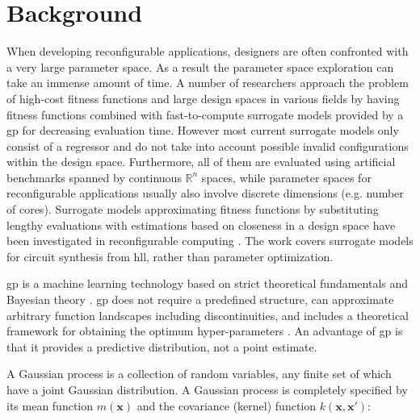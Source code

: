 \documentclass[runningheads,a4paper]{llncs}
\begin{document}
\section{Background}


When developing reconfigurable applications, designers are often confronted with a very large parameter space. As a result the parameter space exploration can take an immense amount of time. A number of researchers approach the problem of high-cost fitness functions and large design spaces in various fields \cite{1041556,surrogateModel,Su:2008:GPA:1494644.1494688,5194095,LeThi2002258} by having fitness functions combined with fast-to-compute surrogate models provided by a \ac{gp} for decreasing evaluation time. However most current surrogate models only consist of a regressor and do not take into account possible invalid configurations within the design space. Furthermore, all of them are evaluated using artificial benchmarks spanned by continuous $\mathbb{R}^n$ spaces, while parameter spaces for reconfigurable applications usually also involve discrete dimensions (e.g. number of cores). Surrogate models approximating fitness functions by substituting lengthy evaluations with estimations based on closeness in a design space have been investigated in reconfigurable computing \cite{Pilato2008}. The work covers surrogate models for circuit synthesis from \ac{hll}, rather than parameter optimization.




\ac{gp} is a machine learning technology based on strict theoretical fundamentals and Bayesian theory \cite{Seeger04gaussianprocesses,Rasmussen06gaussianprocesses}. \ac{gp} does not require a predefined structure, can approximate arbitrary function landscapes including discontinuities, and includes a theoretical framework for obtaining the optimum hyper-parameters \cite{5194095}. An advantage of \ac{gp} is that it provides a predictive distribution, not a point estimate.


A Gaussian process is a collection of random variables, any finite set of which have a joint Gaussian distribution. A Gaussian process is completely specified by its mean function $m(\mathbf{x})$ and the covariance (kernel) function $k(\mathbf{x},\mathbf{x'})$:
\end{document}
